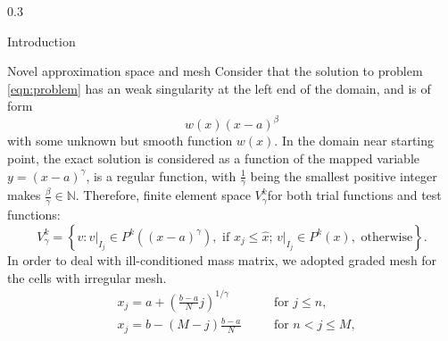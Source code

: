 \documentclass{msuposter}
\newcommand{\colwidth}{0.3\linewidth}
\begin{document}
\begin{frame}{}
\begin{columns}[t]
\begin{column}{\colwidth}
\begin{block}{Introduction}
\end{block}
\begin{block}{Novel approximation space and mesh}
	Consider that the solution to problem \eqref{eqn:problem} has an weak singularity at the left end of the domain, and is of form 
	\begin{equation}
	\label{func:solution form}
	w(x) (x-a)^\beta
	\end{equation} 
	with some unknown but smooth function $w(x)$.
In the domain near starting point, the exact solution is considered as a function of the mapped variable $y = (x-a)^{\gamma}$, is a regular function, with $\frac{1}{\gamma}$ being the smallest positive integer makes $\frac{\beta}{\gamma} \in \mathbb{N}$. 
Therefore,  finite element space $V^k_{\gamma}$for both trial functions and test functions: 
\begin{equation}\label{eqn:functional basis}
V^k_{\gamma} = \left\{v: v\bigr\rvert_{I_j} \in P^k((x-a)^{\gamma}), \text{ if } x_j \leq \hat{x};  \, v \bigr\rvert_{I_j}\in P^{k}(x), \text{ otherwise} \right\}.
\end{equation}
In order to deal with ill-conditioned mass matrix, we adopted graded mesh for the cells with irregular mesh.
\begin{equation}\label{grid:part1}
\begin{aligned}
&x_j = a + \left(\frac{b-a}{N} j \right)^{{1/\gamma}} & \quad  &\text{for }  j \leq n,\\
&x_j = b - (M-j)\frac{b-a}{N} & \quad & \text{for } n < j \leq M,
\end{aligned}
\end{equation}


\end{block}
\end{column}
\end{columns}
\end{frame}
\end{document}
